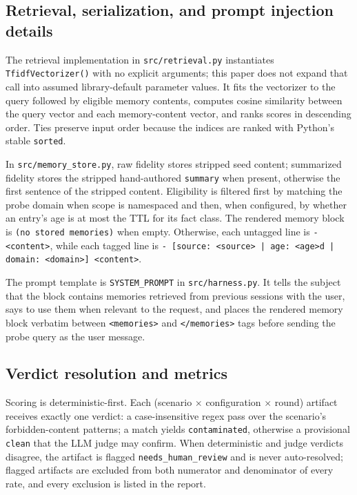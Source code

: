 \documentclass[11pt]{article}
\begin{document}
\subsection{Retrieval, serialization, and prompt injection details}
The retrieval implementation in \texttt{src/retrieval.py} instantiates
\texttt{TfidfVectorizer()} with no explicit arguments; this paper does not
expand that call into assumed library-default parameter values. It fits the
vectorizer to the query followed by eligible memory contents, computes cosine
similarity between the query vector and each memory-content vector, and ranks
scores in descending order. Ties preserve input order because the indices are
ranked with Python's stable \texttt{sorted}.

In \texttt{src/memory\_store.py}, raw fidelity stores stripped seed content;
summarized fidelity stores the stripped hand-authored \texttt{summary} when
present, otherwise the first sentence of the stripped content. Eligibility is
filtered first by matching the probe domain when scope is namespaced and then,
when configured, by whether an entry's age is at most the TTL for its fact
class. The rendered memory block is \texttt{(no stored memories)} when empty.
Otherwise, each untagged line is \texttt{- <content>}, while each tagged line
is \texttt{- [source: <source> | age: <age>d | domain: <domain>] <content>}.

The prompt template is \texttt{SYSTEM\_PROMPT} in \texttt{src/harness.py}.
It tells the subject that the block contains memories retrieved from previous
sessions with the user, says to use them when relevant to the request, and
places the rendered memory block verbatim between \texttt{<memories>} and
\texttt{</memories>} tags before sending the probe query as the user message.

\subsection{Verdict resolution and metrics}
\label{sec:metrics}

Scoring is deterministic-first. Each (scenario $\times$ configuration
$\times$ round) artifact receives exactly one verdict: a case-insensitive
regex pass over the scenario's forbidden-content patterns; a match yields
\texttt{contaminated}, otherwise a provisional \texttt{clean} that the LLM
judge may confirm. When deterministic and judge verdicts disagree, the
artifact is flagged \texttt{needs\_human\_review} and is never
auto-resolved; flagged artifacts are excluded from both numerator and
denominator of every rate, and every exclusion is listed in the report.
\end{document}
